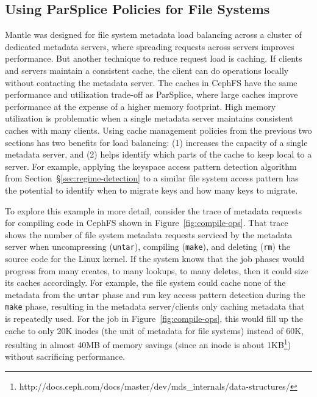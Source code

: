 \subsection{Using ParSplice Policies for File Systems}


Mantle was designed for file system metadata load balancing across a cluster of
dedicated metadata servers, where spreading requests across servers improves
performance. But another technique to reduce request load is caching. If
clients and servers maintain a consistent cache, the client can do operations
locally without contacting the metadata server.  The caches in CephFS have the
same performance and utilization trade-off as ParSplice, where large caches
improve performance at the expense of a higher memory footprint. High memory
utilization is problematic when a single metadata server maintains consistent
caches with many clients.  Using cache management policies from the previous
two sections has two benefits for load balancing: (1) increases the capacity of
a single metadata server, and (2) helps identify which parts of the cache to
keep local to a server. For example, applying the keyspace access pattern
detection algorithm from Section~\S\ref{sec:regime-detection} to a similar file
system access pattern has the potential to identify when to migrate keys and
how many keys to migrate.

To explore this example in more detail, consider the trace of metadata requests
for compiling code in CephFS shown in Figure~\ref{fig:compile-ops}.  That trace
shows the number of file system metadata requests serviced by the metadata
server when uncompressing (\texttt{untar}), compiling (\texttt{make}), and
deleting (\texttt{rm}) the source code for the Linux kernel. If the system
knows that the job phases would progress from many creates, to many lookups, to
many deletes, then it could size its caches accordingly. For example, the file
system could cache none of the metadata from the \texttt{untar} phase and run
key access pattern detection during the \texttt{make} phase, resulting in the metadata
server/clients only caching metadata that is repeatedly used. For the job in
Figure~\ref{fig:compile-ops}, this would fill up the cache to only 20K inodes
(the unit of metadata for file systems) instead of 60K, resulting in almost
40MB of memory savings (since an inode is about
1KB\footnote{http://docs.ceph.com/docs/master/dev/mds\_internals/data-structures/})
without sacrificing performance.

